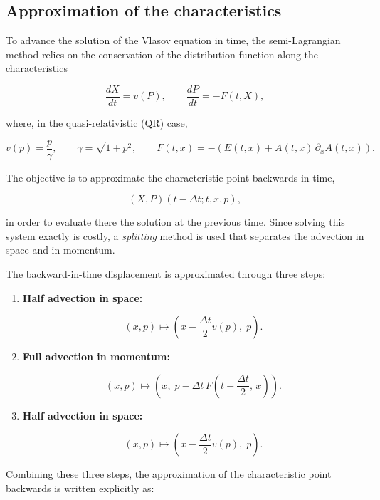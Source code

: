\documentclass[11pt,a4paper,twoside,pdf]{article}
\numberwithin{equation}{section}
\begin{document}



\subsection{Approximation of the characteristics}

To advance the solution of the Vlasov equation in time, the
semi-Lagrangian method relies on the conservation of the distribution function along
the characteristics


\[
\frac{dX}{dt} = v(P), \qquad \frac{dP}{dt} = -F(t,X),
\]


where, in the quasi-relativistic (QR) case,


\[
v(p) = \frac{p}{\gamma}, \qquad \gamma = \sqrt{1+p^2}, \qquad
F(t,x) = -(E(t,x) + A(t,x)\,\partial_x A(t,x)).
\]



The objective is to approximate the characteristic point backwards in time,


\[
(X,P)(t-\Delta t;t,x,p),
\]


in order to evaluate there the solution at the previous time. Since solving this system
exactly is costly, a \emph{splitting} method is used that separates the
advection in space and in momentum.


The backward-in-time displacement is approximated through three steps:

\begin{enumerate}
\item \textbf{Half advection in space:}


\[
(x,p) \longmapsto \left(x - \frac{\Delta t}{2}v(p),\; p\right).
\]



\item \textbf{Full advection in momentum:}


\[
(x,p) \longmapsto \left(x,\; p - \Delta t\,F\!\left(t - \frac{\Delta t}{2},\, x\right)\right).
\]



\item \textbf{Half advection in space:}


\[
(x,p) \longmapsto \left(x - \frac{\Delta t}{2}v(p),\; p\right).
\]


\end{enumerate}

Combining these three steps, the approximation of the characteristic point backwards is
written explicitly as:
\end{document}
